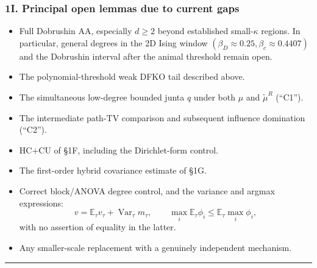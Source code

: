\subsubsection{1I. Principal open lemmas due to current gaps}\label{i.-principal-open-lemmas-due-to-current-gaps}

\begin{itemize}
\tightlist
\item
  Full Dobrushin AA, especially \(d\ge2\) beyond established small-\(\kappa\) regions. In particular, general degrees in the 2D Ising window \((\beta_D\approx0.25,\beta_c\approx0.4407)\) and the Dobrushin interval after the animal threshold remain open.
\item
  The polynomial-threshold weak DFKO tail described above.
\item
  The simultaneous low-degree bounded junta \(q\) under both \(\mu\) and \(\widetilde{\mu}^R\) (``C1'').
\item
  The intermediate path-TV comparison and subsequent influence domination (``C2'').
\item
  HC+CU of §1F, including the Dirichlet-form control.
\item
  The first-order hybrid covariance estimate of §1G.
\item
  Correct block/ANOVA degree control, and the variance and argmax expressions:
  \[v=\mathbb E_\tau v_\tau+\operatorname{Var}_\tau m_\tau,\qquad
  \max_i\mathbb E_\tau\phi_i\le\mathbb E_\tau\max_i\phi_i,\]
  with no assertion of equality in the latter.
\item
  Any smaller-scale replacement with a genuinely independent mechanism.
\end{itemize}

\begin{center}\rule{0.5\linewidth}{0.5pt}\end{center}
